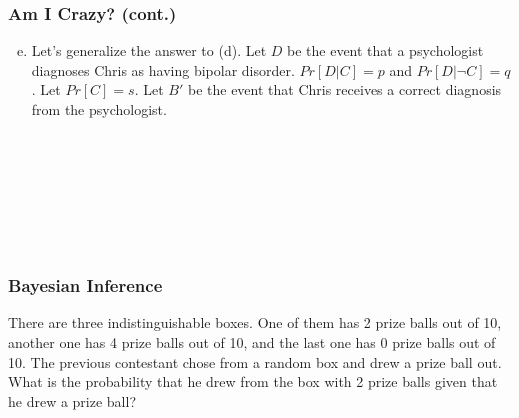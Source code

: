 \documentclass[9pt]{beamer}
\begin{document}
\begin{frame}
  \frametitle{Am I Crazy? (cont.)}
\begin{enumerate}[(a)]
\setcounter{enumi}{4}
\item Let's generalize the answer to (d). Let $D$ be the event that a psychologist diagnoses Chris as having bipolar disorder. $Pr[D|C] = p$ and $Pr[D|\neg C] = q$. Let $Pr[C] = s$. Let $B'$ be the event that Chris receives a correct diagnosis from the psychologist. \\
\begin{enumerate}[i]
\\ \vspace{5.00mm}
\\
\\ \vspace{5.00mm}
\\
\\ \vspace{5.00mm}
\\
\end{enumerate}
\end{enumerate}
\end{frame}




\begin{frame}
  \frametitle{Bayesian Inference}
There are three indistinguishable boxes. One of them has 2 prize balls out of 10, another one has 4 prize balls out of 10, and the last one has 0 prize balls out of 10. The previous contestant chose from a random box and drew a prize ball out. What is the probability that he drew from the box with 2 prize balls given that he drew a prize ball?
\end{frame}
\end{document}
